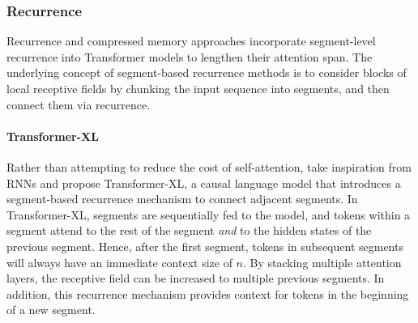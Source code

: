 \subsubsection{Recurrence}

Recurrence and compressed memory approaches incorporate segment-level recurrence into Transformer models to lengthen their attention span. The underlying concept of segment-based recurrence methods is to consider blocks of local receptive fields by chunking the input sequence into segments, and then connect them via recurrence.

\paragraph{Transformer-XL} Rather than attempting to reduce the cost of self-attention, \citet{dai2019transformer} take inspiration from \acp{RNN} and propose Transformer-XL, a causal language model that introduces a segment-based recurrence mechanism to connect adjacent segments. In Transformer-XL, segments are sequentially fed to the model, and tokens within a segment attend to the rest of the segment \textit{and} to the hidden states of the previous segment. Hence, after the first segment, tokens in subsequent segments will always have an immediate context size of $n$. By stacking multiple attention layers, the receptive field can be increased to multiple previous segments. In addition, this recurrence mechanism provides context for tokens in the beginning of a new segment. 
 



